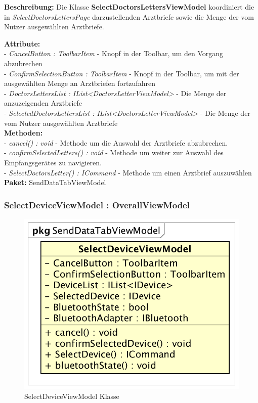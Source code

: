 \documentclass[a4paper]{scrreprt}
\begin{document}
\textbf{Beschreibung:} Die Klasse \textbf{SelectDoctorsLettersViewModel} koordiniert die in \textit{SelectDoctorsLettersPage} darzustellenden Arztbriefe sowie die Menge der vom Nutzer ausgewählten Arztbriefe.

\textbf{Attribute:}\\
- \textit{CancelButton : ToolbarItem} - Knopf in der Toolbar, um den Vorgang abzubrechen\\
- \textit{ConfirmSelectionButton : ToolbarItem} - Knopf in der Toolbar, um mit der ausgewählten Menge an Arztbriefen fortzufahren\\
- \textit{DoctorsLettersList : IList<DoctorsLetterViewModel>} - Die Menge der anzuzeigenden Arztbriefe\\
- \textit{SelectedDoctorsLettersList : IList<DoctorsLetterViewModel>} - Die Menge der vom Nutzer ausgewählten Arztbriefe\\

\textbf{Methoden:}\\
- \textit{cancel() : void} - Methode um die Auswahl der Arztbriefe abzubrechen.\\
- \textit{confirmSelectedLetters() : void} - Methode um weiter zur Auswahl des Empfangsgerätes zu navigieren.\\
- \textit{SelectDoctorsLetter() : ICommand} - Methode um einen Arztbrief auszuwählen\\

\textbf{Paket:} SendDataTabViewModel

\subsubsection{SelectDeviceViewModel : OverallViewModel}
\begin{figure}[H]
\centering
\includegraphics[width=0.45\textheight]{graphics/Klassendiagramme/ViewModel/SelectDeviceViewModel.png}
\caption{SelectDeviceViewModel Klasse}
\end{figure}
\end{document}
